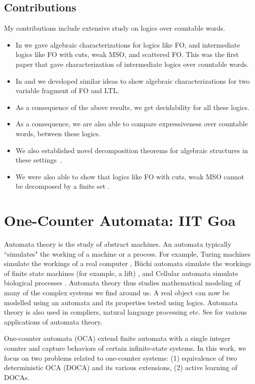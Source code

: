 \documentclass[11pt]{article}
\begin{document}
\subsection{Contributions}
My contributions include extensive study on logics over countable words.
\begin{itemize}
    \item In \cite{icalp15} we gave algebraic characterizations for logics like \textsf{FO}, and intermediate logics like \textsf{FO} with cuts, weak \textsf{MSO}, and scattered \textsf{FO}. This was the first paper that gave characterization of intermediate logics over countable words.
    \item In \cite{ms16} and \cite{lics19} we developed similar ideas to show algebraic characterizations for two variable fragment of \textsf{FO} and \textsf{LTL}.
    \item As a consequence of the above results, we get decidability for all these logics.
    \item As a consequence, we are also able to compare expressiveness over countable words, between these logics.
    \item We also established novel decomposition theorems for algebraic structures in these settings~\cite{lics19,jcss23}.
    \item We were also able to show that logics like \textsf{FO} with cuts, weak \textsf{MSO} cannot be decomposed by a finite set \cite{fct21}.
\end{itemize}

\section{One-Counter Automata: IIT Goa}
Automata theory is the study of abstract machines. An automata typically ``simulates" the working of a machine or a process. For example, Turing machines simulate the workings of a real computer \cite{sipser_tocBook}, B\"uchi automata simulate the workings of finite state machines (for example, a lift) \cite{vardi95}, and Cellular automata simulate biological processes \cite{Barto75}. Automata theory thus studies mathematical modeling of many of the complex systems we find around us. A real object can now be modelled using an automata and its properties tested using logics. Automata theory is also used in compliers, natural language processing etc. See \cite{deepak_bookAppAutomata} for various applications of automata theory.

One-counter automata (OCA) extend finite automata with a single integer counter and capture behaviors of certain infinite-state systems. In this work, we focus on two problems related to one-counter systems: (1) equivalence of two deterministic OCA (DOCA) and its various extensions, (2) active learning of DOCAs.
\end{document}
